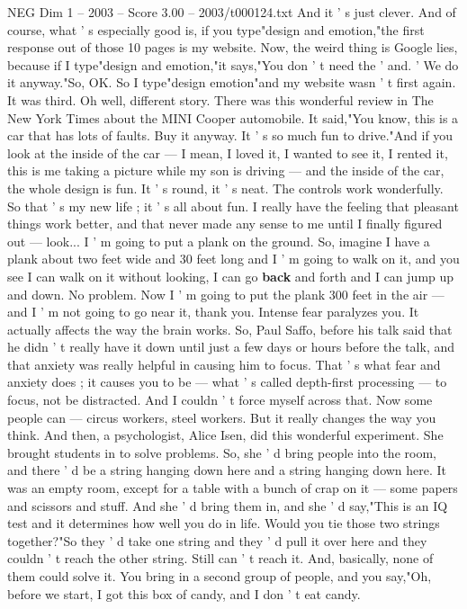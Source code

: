 \begin{textsample}{NEG Dim 1 – 2003 – Score 3.00 – 2003/t000124.txt}
And it ' s just clever.
And of course, what ' s especially good is, if you type"design and emotion,"the first response out of those 10 pages is my website.
Now, the weird thing is Google lies, because if I type"design and emotion,"it says,"You don ' t need the ' and. ' We do it anyway."So, OK.
So I type"design emotion"and my website wasn ' t first again.
It was third.
Oh well, different story.
There was this wonderful review in The New York Times about the MINI Cooper automobile.
It said,"You know, this is a car that has lots of faults.
Buy it anyway.
It ' s so much fun to drive."And if you look at the inside of the car — I mean, I loved it, I wanted to see it, I rented it, this is me taking a picture while my son is driving — and the inside of the car, the whole design is fun.
It ' s round, it ' s neat.
The controls work wonderfully.
So that ' s my new life ; it ' s all about fun.
I really have the feeling that pleasant things work better, and that never made any sense to me until I finally figured out — look...
I ' m going to put a plank on the ground.
So, imagine I have a plank about two feet wide and 30 feet long and I ' m going to walk on it, and you see I can walk on it without looking, I can go \textbf{back} and forth and I can jump up and down.
No problem.
Now I ' m going to put the plank 300 feet in the air — and I ' m not going to go near it, thank you.
Intense fear paralyzes you.
It actually affects the way the brain works.
So, Paul Saffo, before his talk said that he didn ' t really have it down until just a few days or hours before the talk, and that anxiety was really helpful in causing him to focus.
That ' s what fear and anxiety does ; it causes you to be — what ' s called depth-first processing — to focus, not be distracted.
And I couldn ' t force myself across that.
Now some people can — circus workers, steel workers.
But it really changes the way you think.
And then, a psychologist, Alice Isen, did this wonderful experiment.
She brought students in to solve problems.
So, she ' d bring people into the room, and there ' d be a string hanging down here and a string hanging down here.
It was an empty room, except for a table with a bunch of crap on it — some papers and scissors and stuff.
And she ' d bring them in, and she ' d say,"This is an IQ test and it determines how well you do in life.
Would you tie those two strings together?"So they ' d take one string and they ' d pull it over here and they couldn ' t reach the other string.
Still can ' t reach it.
And, basically, none of them could solve it.
You bring in a second group of people, and you say,"Oh, before we start, I got this box of candy, and I don ' t eat candy.

\end{textsample}
